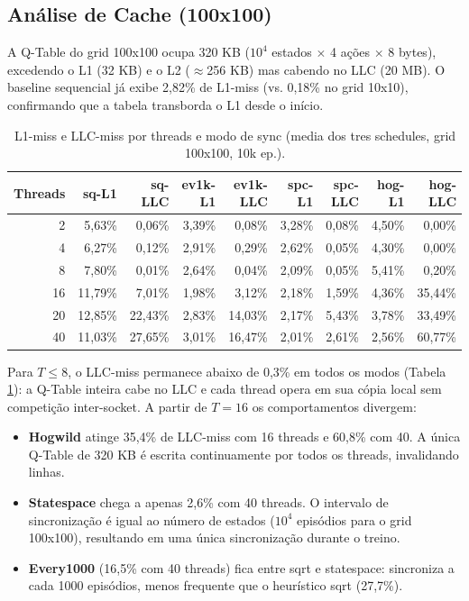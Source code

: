 \documentclass[12pt]{article}
\begin{document}
\subsection{Análise de Cache (100x100)}
\label{sec:orgc84981b}

A Q-Table do grid 100x100 ocupa 320 KB (\(10^4\) estados \(\times\) 4 ações
\(\times\) 8 bytes), excedendo o L1 (32 KB) e o L2 (\(\approx\)256 KB) mas
cabendo no LLC (20 MB). O baseline sequencial já exibe 2,82\%
de L1-miss (vs. 0,18\% no grid 10x10), confirmando que a tabela
transborda o L1 desde o início.

\begin{table}[htbp]
\caption{\label{tab:org04378e1}L1-miss e LLC-miss por threads e modo de sync (media dos tres schedules, grid 100x100, 10k ep.).}
\centering
\scriptsize
\begin{tabular}{rrrrrrrrr}
\toprule
Threads & sq-L1 & sq-LLC & ev1k-L1 & ev1k-LLC & spc-L1 & spc-LLC & hog-L1 & hog-LLC\\
\midrule
2 & 5,63\% & 0,06\% & 3,39\% & 0,08\% & 3,28\% & 0,08\% & 4,50\% & 0,00\%\\
4 & 6,27\% & 0,12\% & 2,91\% & 0,29\% & 2,62\% & 0,05\% & 4,30\% & 0,00\%\\
8 & 7,80\% & 0,01\% & 2,64\% & 0,04\% & 2,09\% & 0,05\% & 5,41\% & 0,20\%\\
\midrule
16 & 11,79\% & 7,01\% & 1,98\% & 3,12\% & 2,18\% & 1,59\% & 4,36\% & 35,44\%\\
20 & 12,85\% & 22,43\% & 2,83\% & 14,03\% & 2,17\% & 5,43\% & 3,78\% & 33,49\%\\
40 & 11,03\% & 27,65\% & 3,01\% & 16,47\% & 2,01\% & 2,61\% & 2,56\% & 60,77\%\\
\bottomrule
\end{tabular}
\end{table}

Para \(T \leq 8\), o LLC-miss permanece abaixo de 0,3\% em todos os
modos (Tabela \ref{tab:org04378e1}): a Q-Table inteira cabe no LLC e cada thread
opera em sua cópia local sem competição inter-socket. A partir de \(T =
16\) os comportamentos divergem:

\begin{itemize}
\item \textbf{Hogwild} atinge 35,4\% de LLC-miss com 16 threads e 60,8\% com 40.
A única Q-Table de 320 KB é escrita continuamente por todos os
threads, invalidando linhas.
\item \textbf{Statespace} chega a apenas 2,6\% com 40 threads. O intervalo de
sincronização é igual ao número de estados (\(10^4\) episódios para o
grid 100x100), resultando em uma única sincronização durante o
treino.
\item \textbf{Every1000} (16,5\% com 40 threads) fica entre sqrt e statespace:
sincroniza a cada 1000 episódios, menos frequente que o heurístico
sqrt (27,7\%).
\end{itemize}
\end{document}
